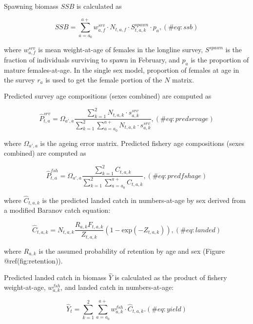 \documentclass[
]{article}
\begin{document}
Spawning biomass \(SSB\) is calculated as

\[
\begin{equation}
SSB=\sum_{a=a_0}^{a+} w_{a,f}^{srv} \cdot N_{t,a,f} \cdot S_{t,a,k}^{spawn} \cdot p_a,
(\#eq:ssb)
\end{equation}
\]

where \(w_{a,f}^{srv}\) is mean weight-at-age of females in the longline
survey, \(S^{spawn}\) is the fraction of individuals surviving to spawn
in February, and \(p_a\) is the proportion of mature females-at-age. In
the single sex model, proportion of females at age in the survey \(r_a\)
is used to get the female portion of the \(N\) matrix.

Predicted survey age compositions (sexes combined) are computed as

\[
\begin{equation}
\hat{P}_{t,a}^{srv}=\Omega_{a',a}\frac{\sum_{k=1}^{2}N_{t,a,k} \cdot s_{a,k}^{srv}}{\sum_{k=1}^{2}\sum_{a=a_0}^{a+} N_{t,a,k} \cdot s_{a,k}^{srv}},
(\#eq:predsrvage)
\end{equation}
\]

where \(\Omega_{a',a}\) is the ageing error matrix. Predicted fishery
age compositions (sexes combined) are computed as

\[
\begin{equation}
\hat{P}_{t,a}^{fsh}=\Omega_{a',a}\frac{\sum_{k=1}^{2}C_{t,a,k}}{\sum_{k=1}^{2}\sum_{a=a_0}^{a+} C_{t,a,k}},
(\#eq:predfshage)
\end{equation}
\]

where \(\hat{C}_{t,a,k}\) is the predicted landed catch in
numbers-at-age by sex derived from a modified Baranov catch equation:

\[
\begin{equation}
\hat{C}_{t,a,k}=N_{t,a,k}\frac{R_{a,k}F_{t,a,k}}{Z_{t,a,k}}(1-\mbox{exp}(-Z_{t,a,k})),
(\#eq:landed)
\end{equation}
\]

where \(R_{a,k}\) is the assumed probability of retention by age and sex
(Figure @ref(fig:retention)).

Predicted landed catch in biomass \(\hat{Y}\) is calculated as the
product of fishery weight-at-age, \(w_{a,k}^{fsh}\), and landed catch in
numbers-at-age:

\[
\begin{equation}
\hat{Y}_t=\sum_{k=1}^{2}\sum_{a=a_0}^{a+} w_{a,k}^{fsh} \cdot \hat{C}_{t,a,k}.
(\#eq:yield)
\end{equation}
\]
\end{document}
